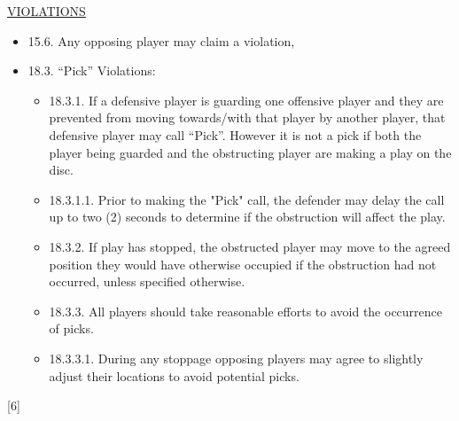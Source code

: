\begin{center}\underline{\uppercase{violations}}\end{center}
\begin{itemize}[noitemsep]
    \tiny
    \item 15.6. Any opposing player may claim a violation,
    \item 18.3. “Pick” Violations:
        \begin{itemize}
            \item 18.3.1. If a defensive player is guarding one offensive player and they are prevented from moving towards/with that player by another player, that defensive player may call “Pick”. However it is not a pick if both the player being guarded and the obstructing player are making a play on the disc.
            \item 18.3.1.1. Prior to making the "Pick" call, the defender may delay the call up to two (2) seconds to determine if the obstruction will affect the play.
            \item 18.3.2. If play has stopped, the obstructed player may move to the agreed position they would have otherwise occupied if the obstruction had not occurred, unless specified otherwise.
            \item 18.3.3. All players should take reasonable efforts to avoid the occurrence of picks.
            \item 18.3.3.1. During any stoppage opposing players may agree to slightly adjust their locations to avoid potential picks.
        \end{itemize}
\end{itemize}
\begin{center}[6]\end{center}
